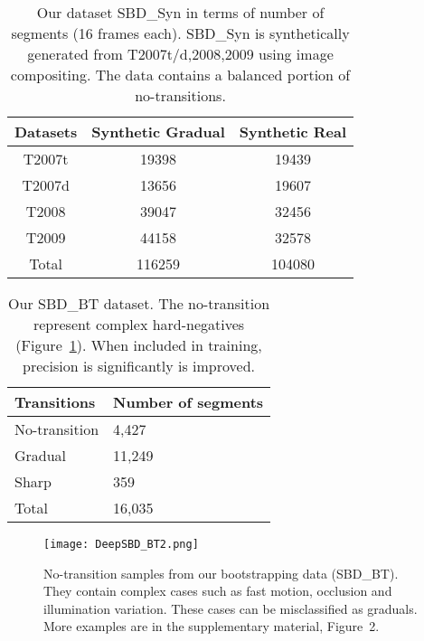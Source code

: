 \documentclass[journal]{IEEEtran}
\begin{document}
\begin{table}
\centering

\begin{tabular}{| c | c | c | }
     \hline      
			Datasets									    &   Synthetic  Gradual    &  Synthetic Real      \\
     \hline
T2007t            & 19398	& 19439 	\\
		     T2007d            & 13656	& 19607		\\
				 T2008              & 39047	& 32456		\\
				 T2009              & 44158	& 32578 	\\ 
\hline
Total               & 116259 & 104080   \\ 
			\hline 
    \end{tabular}\vspace{3pt}
\caption{Our dataset SBD\_Syn in terms of number of segments (16 frames each). SBD\_Syn is synthetically generated from T2007t/d,2008,2009 using image compositing. The data contains a balanced portion of no-transitions.
}
\label{tab:DeepSBDSyn}
\end{table}



\begin{table}
\small
\centering
\begin{tabular}{| l | l | }
     \hline      
			Transitions									    &   Number of segments    \\
     \hline
				 No-transition              & 4,427 \\
			   Gradual              & 11,249 \\
				 Sharp            & 359 \\
			\hline
			Total               & 16,035 \\ 
			\hline
    \end{tabular}\vspace{3pt}
\caption{Our SBD\_BT dataset. The no-transition represent complex hard-negatives (Figure~\ref{fig:BTData}). When included in training, precision is significantly is improved.}
\label{tab:DeepSBDBT}
\end{table}

\begin{figure}
  \centering
   \texttt{[image: DeepSBD\_BT2.png]}
   \caption{No-transition samples from our bootstrapping data (SBD\_BT). They contain complex cases such as fast motion, occlusion and illumination variation. These cases can be misclassified as graduals. More examples are in the supplementary material, Figure~2.}
\label{fig:BTData}
 \end{figure}
\end{document}
